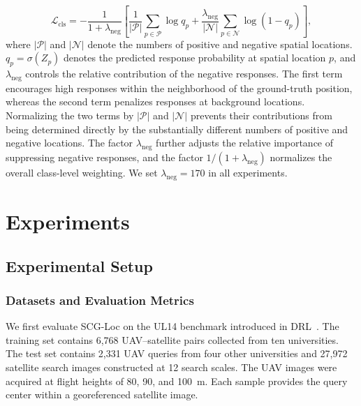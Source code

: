\documentclass[runningheads]{llncs}
\begin{document}
\begin{equation}
\mathcal{L}_{\mathrm{cls}}
=
-\frac{1}{1+\lambda_{\mathrm{neg}}}
\left[
\frac{1}{|\mathcal{P}|}
\sum_{p\in\mathcal{P}}\log q_p
+
\frac{\lambda_{\mathrm{neg}}}{|\mathcal{N}|}
\sum_{p\in\mathcal{N}}\log(1-q_p)
\right],
\label{eq:classification_loss}
\end{equation}
where $|\mathcal{P}|$ and $|\mathcal{N}|$ denote the numbers of positive and negative spatial locations. $q_p=\sigma(Z_p)$ denotes the predicted response probability at spatial location $p$, and $\lambda_{\mathrm{neg}}$ controls the relative contribution of the negative responses. The first term encourages high responses within the neighborhood of the ground-truth position, whereas the second term penalizes responses at background locations. Normalizing the two terms by $|\mathcal{P}|$ and $|\mathcal{N}|$ prevents their contributions from being determined directly by the substantially different numbers of positive and negative locations. The factor $\lambda_{\mathrm{neg}}$ further adjusts the relative importance of suppressing negative responses, and the factor $1/(1+\lambda_{\mathrm{neg}})$ normalizes the overall class-level weighting. We set $\lambda_{\mathrm{neg}}=170$ in all experiments. 

\FloatBarrier

\section{Experiments}

\subsection{Experimental Setup}

\subsubsection{Datasets and Evaluation Metrics}

We first evaluate SCG-Loc on the UL14 benchmark introduced in DRL~\cite{dai2026drl}. The training set contains 6,768 UAV--satellite pairs collected from ten universities. The test set contains 2,331 UAV queries from four other universities and 27,972 satellite search images constructed at 12 search scales. The UAV images were acquired at flight heights of 80, 90, and 100~m. Each sample provides the query center within a georeferenced satellite image.
\end{document}

